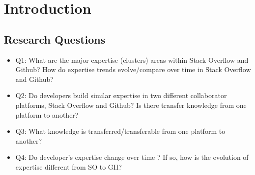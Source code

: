 \chapter{Introduction}
\section{Research Questions}

\begin{itemize}
    \item Q1: What are the major expertise (clusters) areas within Stack Overflow and Github? How do expertise trends evolve/compare over time in Stack Overflow and Github?
    \item Q2: Do developers build similar expertise in two different collaborator platforms, Stack Overflow and Github? Is there transfer knowledge from one platform to another?
    \item Q3: What knowledge is transferred/transferable from one platform to another?
    \item Q4: Do developer's expertise change over time ? If so, how is the evolution of expertise different from SO to GH?
\end{itemize}
